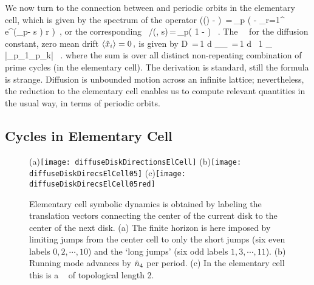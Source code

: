 \documentclass[aps,pre,preprint,groupedaddress,floatfix]{revtex4-1}
\begin{document}
We now turn to the connection between  and periodic orbits in the elementary cell, which is given by the spectrum of the operator
\beq
\det(\eigenvL (\beta) - \Aop)  \,=\,\prod_{p}
\exp \left( - {
               \sum_{r=1}^
               {
                e^{(\beta \cdot \hn_p- s ) r}
 \over  {}
                }
              } \right)
\,,
or the corresponding \dzeta\
/\zeta(\beta, s)\,=\,\prod_{p}\left( 1 -  \right)
~.
\label{zeta-diff}
\eeq
The \dzeta\ \cycForm\ for the diffusion constant, zero mean drift
$
\left\langle { \hat{x}_i } \right\rangle = 0
\,,
$
is given by
\beq
D \,=\,{1  d} { _\zeta \over \expct{\period{}}_\zeta }
  \,=\,{1 \over 2 d } \, {1 \over \expct{\period{}}_\zeta}
  \sumprime {}
  {|\ExpaEig_{p_1}\cdots \ExpaEig_{p_k}|}
\, .
\label{(17)}
\eeq
where the sum is over all distinct non-repeating combination of prime cycles (in the elementary cell). The derivation is standard, still the formula is strange. Diffusion is unbounded motion across an infinite lattice; nevertheless, the reduction to the elementary cell enables us to compute relevant quantities in the usual way, in terms of periodic orbits.

\subsection{Cycles in Elementary Cell}
\begin{figure}
\begin{center}
(a)\texttt{[image: diffuseDiskDirectionsElCell]}
(b)\texttt{[image: diffuseDiskDirecsElCell05]}
(c)\texttt{[image: diffuseDiskDirecsElCell05red]}
\end{center}
\caption{
Elementary cell symbolic dynamics is obtained by labeling the translation vectors connecting the center of the current disk to the center of the next disk. (a) The finite horizon is here imposed by limiting jumps from the center cell to only the short jumps (six even labels $0, 2,\cdots,10$) and the `long jumps' (six odd labels $1, 3,\cdots,11$). (b) Running mode  advances by $\hat n_4$ per period. (c) In the elementary cell this is a \po\ 
    of topological length 2.
    }
\label{fig-diskDirectionsElCell}
\end{figure}
\end{document}
